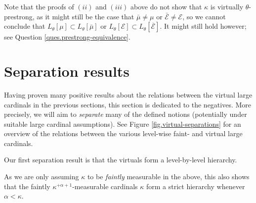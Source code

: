 \documentclass[../../main]{subfiles}
\begin{document}
Note that the proofs of $(ii)$ and $(iii)$ above do not show that $\kappa$ is virtually $\theta$-prestrong, as it might still be the case that $\bar\mu\neq\mu$ or $\bar{\mathcal E}\neq\mathcal E$, so we cannot conclude that $L_\theta[\mu]\subset L_\theta[\bar\mu]$ or $L_\theta[\mathcal E]\subset L_\theta[\overline{\mathcal E}]$. It might still hold however; see Question \ref{ques.prestrong-equivalence}.


\section{Separation results}

Having proven many positive results about the relations between the virtual large cardinals in the previous sections, this section is dedicated to the negatives. More precisely, we will aim to \textit{separate} many of the defined notions (potentially under suitable large cardinal assumptions). See Figure \ref{fig.virtual-separations} for an overview of the relations between the various level-wise faint- and virtual large cardinals.

\qquad Our first separation result is that the virtuals form a level-by-level hierarchy.


As we are only assuming $\kappa$ to be \textit{faintly} measurable in the above, this also shows that the faintly $\kappa^{+\alpha+1}$-measurable cardinals $\kappa$ form a strict hierarchy whenever $\alpha<\kappa$.
\end{document}
